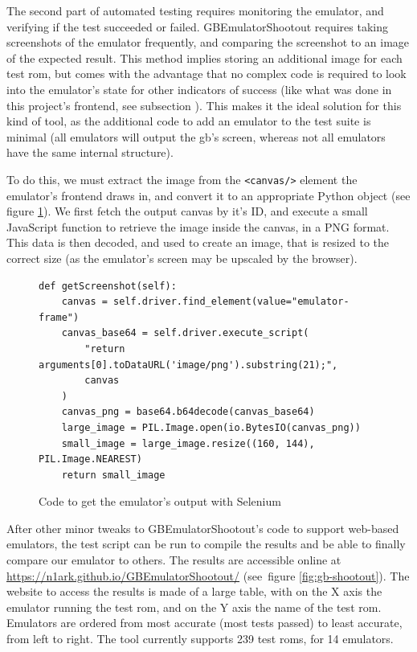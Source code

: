 \documentclass[11pt]{informatics-report}
\begin{document}
The second part of automated testing requires monitoring the emulator, and verifying if the test succeeded or failed. GBEmulatorShootout requires taking screenshots of the emulator frequently, and comparing the screenshot to an image of the expected result. This method implies storing an additional image for each test \gls{rom}, but comes with the advantage that no complex code is required to look into the emulator's state for other indicators of success (like what was done in this project's frontend, see subsection ). This makes it the ideal solution for this kind of tool, as the additional code to add an emulator to the test suite is minimal (all emulators will output the \glsdesc{gb}'s screen, whereas not all emulators have the same internal structure).

To do this, we must extract the image from the \texttt{<canvas/>} element the emulator's frontend draws in, and convert it to an appropriate Python object (see figure \ref{fig:selenium-screenshot}). We first fetch the output canvas by it's ID, and execute a small JavaScript function to retrieve the image inside the canvas, in a PNG format. This data is then decoded, and used to create an image, that is resized to the correct size (as the emulator's screen may be upscaled by the browser).

\begin{figure}[h]
    \begin{verbatim}
def getScreenshot(self):
    canvas = self.driver.find_element(value="emulator-frame")
    canvas_base64 = self.driver.execute_script(
    	"return arguments[0].toDataURL('image/png').substring(21);",
    	canvas
    )
    canvas_png = base64.b64decode(canvas_base64)
    large_image = PIL.Image.open(io.BytesIO(canvas_png))
    small_image = large_image.resize((160, 144), PIL.Image.NEAREST)
    return small_image
    \end{verbatim}
    \caption{Code to get the emulator's output with Selenium}
    \label{fig:selenium-screenshot}
\end{figure}

After other minor tweaks to GBEmulatorShootout's code to support web-based emulators, the test script can be run to compile the results and be able to finally compare our emulator to others. The results are accessible online at \url{https://n1ark.github.io/GBEmulatorShootout/} (see~figure \ref{fig:gb-shootout}). The website to access the results is made of a large table, with on the X axis the emulator running the test \gls{rom}, and on the Y axis the name of the test \gls{rom}. Emulators are ordered from most accurate (most tests passed) to least accurate, from left to right. The tool currently supports 239 test \glspl{rom}, for 14 emulators.
\end{document}
